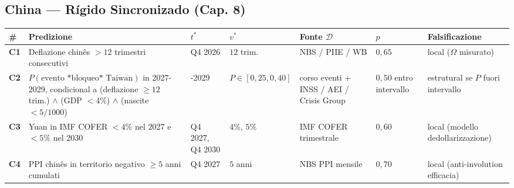 \subsection{China --- Rígido Sincronizado (Cap.
8)}\label{cina-rigido-sincronizzato-cap.-8}

{\def\LTcaptype{none} %
{\small\begin{longtable}[]{@{}
  >{\raggedright\arraybackslash}p{}
  >{\raggedright\arraybackslash}p{}
  >{\raggedright\arraybackslash}p{}
  >{\raggedright\arraybackslash}p{}
  >{\raggedright\arraybackslash}p{}
  >{\raggedright\arraybackslash}p{}
  >{\raggedright\arraybackslash}p{}@{}}
\toprule\noalign{}
\begin{minipage}[b]{\linewidth}\raggedright
\#
\end{minipage} & \begin{minipage}[b]{\linewidth}\raggedright
Predizione
\end{minipage} & \begin{minipage}[b]{\linewidth}\raggedright
\(t^*\)
\end{minipage} & \begin{minipage}[b]{\linewidth}\raggedright
\(v^*\)
\end{minipage} & \begin{minipage}[b]{\linewidth}\raggedright
Fonte \(\mathcal{D}\)
\end{minipage} & \begin{minipage}[b]{\linewidth}\raggedright
\(p\)
\end{minipage} & \begin{minipage}[b]{\linewidth}\raggedright
Falsificazione
\end{minipage} \\
\midrule\noalign{}
\endhead
\bottomrule\noalign{}
\endlastfoot
\textbf{C1} & Deflazione chinês \(> 12\) trimestri consecutivi & Q4 2026
& \(12\) trim. & NBS / PIIE / WB & \(0{,}65\) & local (\(\Omega\)
misurato) \\
\textbf{C2} & \(P(\text{evento *bloqueo* Taiwan})\) in 2027-2029,
condicional a (deflazione \(\geq 12\) trim.) \(\wedge\) (GDP \(< 4\%\))
\(\wedge\) (nascite \(< 5/1000\)) & 2027-2029 &
\(P \in [0{,}25, 0{,}40]\) & corso eventi + INSS / AEI / Crisis Group &
\(0{,}50\) entro intervallo & estrutural se \(P\) fuori intervallo \\
\textbf{C3} & Yuan in IMF COFER \(< 4\%\) nel 2027 e \(< 5\%\) nel 2030
& Q4 2027, Q4 2030 & \(4\%\), \(5\%\) & IMF COFER trimestrale &
\(0{,}60\) & local (modello dedollarizzazione) \\
\textbf{C4} & PPI chinês in territorio negativo \(\geq 5\) anni cumulati
& Q4 2027 & \(5\) anni & NBS PPI mensile & \(0{,}70\) & local
(anti-involution efficacia) \\
\end{longtable}}
}

